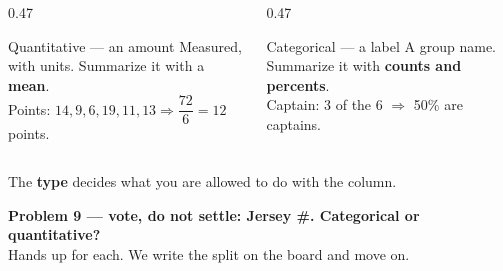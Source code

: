 \documentclass[aspectratio=169, 11pt]{beamer}
\newcommand{\redink}[1]{{\color{redacc}\bfseries #1}}
\begin{document}
\begin{frame}[t, plain]
  \vspace{4pt}
  \begin{columns}[t]
    \begin{column}{0.47\textwidth}
      \begin{block}{Quantitative --- an amount}
        Measured, with units. Summarize it with a \textbf{mean}.\\[4pt]
        {\small Points: $14, 9, 6, 19, 11, 13 \Rightarrow \dfrac{72}{6} = 12$ points.}
      \end{block}
    \end{column}
    \begin{column}{0.47\textwidth}
      \begin{block}{Categorical --- a label}
        A group name. Summarize it with \textbf{counts and percents}.\\[4pt]
        {\small Captain: 3 of the 6 $\Rightarrow$ 50\% are captains.}
      \end{block}
    \end{column}
  \end{columns}
  \vspace{10pt}
  \begin{center}
    {\large The \redink{type} decides what you are allowed to do with the column.}
  \end{center}
  \vspace{8pt}
  \begin{center}
    {\color{goldacc}\bfseries\large Problem 9 --- vote, do not settle: Jersey \#. Categorical
    or quantitative?}\\[4pt]
    {\small\color{slate} Hands up for each. We write the split on the board and move on.}
  \end{center}
\end{frame}
\end{document}
